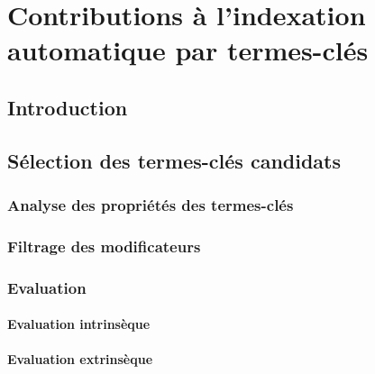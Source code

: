 \chapter{Contributions à l'indexation automatique par termes-clés}
\label{chap:main-automatic_keyphrase_annotation}
  \section{Introduction}
  \label{sec:main-automatic_keyphrase_annotation-introduction}


  \section{Sélection des termes-clés candidats}
  \label{sec:main-automatic_keyphrase_annotation-keyphrase_candidate_selection}
    \subsection{Analyse des propriétés des termes-clés}
    \label{subsec:main-automatic_keyphrase_annotation-keyphrase_candidate_selection-analysis_of_keyphrase_properties}

    \subsection{Filtrage des modificateurs}
    \label{subsec:main-automatic_keyphrase_annotation-keyphrase_candidate_selection-modifiers_filtering}

    \subsection{Evaluation}
    \label{subsec:main-automatic_keyphrase_annotation-keyphrase_candidate_selection-evaluation}
      \subsubsection{Evaluation intrinsèque}
      \label{subsubsec:main-automatic_keyphrase_annotation-keyphrase_candidate_selection-evaluation-intrinsic_evaluation}

      \subsubsection{Evaluation extrinsèque}
      \label{subsubsec:main-automatic_keyphrase_annotation-keyphrase_candidate_selection-evaluation-extrinsic_evaluation}

